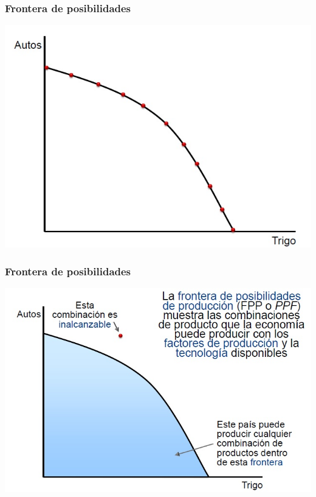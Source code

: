 \documentclass{beamer}
\begin{document}
\begin{frame}
\frametitle{Frontera de posibilidades}
\begin{center}
    \includegraphics[scale=0.6]{Slides Principios de Economia/Tema_11.3_frontera.jpg}
\end{center}
\end{frame}

\begin{frame}
\frametitle{Frontera de posibilidades}
\begin{center}
    \includegraphics[scale=0.55]{Slides Principios de Economia/Tema_11.4_fronteradeposibilidades.jpg}
\end{center}
\end{frame}
\end{document}
